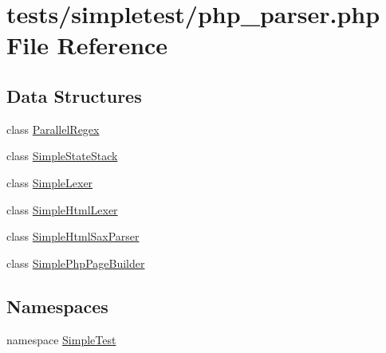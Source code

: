 \hypertarget{php__parser_8php}{\section{tests/simpletest/php\-\_\-parser.php File Reference}
\label{php__parser_8php}
}
\subsection*{Data Structures}
\begin{DoxyCompactItemize}
\item 
class \hyperlink{class_parallel_regex}{Parallel\-Regex}
\item 
class \hyperlink{class_simple_state_stack}{Simple\-State\-Stack}
\item 
class \hyperlink{class_simple_lexer}{Simple\-Lexer}
\item 
class \hyperlink{class_simple_html_lexer}{Simple\-Html\-Lexer}
\item 
class \hyperlink{class_simple_html_sax_parser}{Simple\-Html\-Sax\-Parser}
\item 
class \hyperlink{class_simple_php_page_builder}{Simple\-Php\-Page\-Builder}
\end{DoxyCompactItemize}
\subsection*{Namespaces}
\begin{DoxyCompactItemize}
\item 
namespace \hyperlink{namespace_simple_test}{Simple\-Test}
\end{DoxyCompactItemize}
